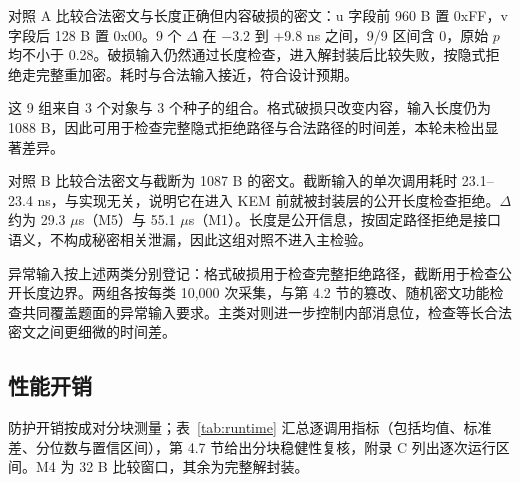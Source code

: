 对照 A 比较合法密文与长度正确但内容破损的密文：u 字段前 960 B 置 0xFF，v 字段后 128 B 置 0x00。9 个 $\Delta$ 在 $-3.2$ 到 +9.8 ns 之间，9/9 区间含 0，原始 $p$ 均不小于 0.28。破损输入仍然通过长度检查，进入解封装后比较失败，按隐式拒绝走完整重加密。耗时与合法输入接近，符合设计预期。

这 9 组来自 3 个对象与 3 个种子的组合。格式破损只改变内容，输入长度仍为 1088 B，因此可用于检查完整隐式拒绝路径与合法路径的时间差，本轮未检出显著差异。

对照 B 比较合法密文与截断为 1087 B 的密文。截断输入的单次调用耗时 23.1--23.4 ns，与实现无关，说明它在进入 KEM 前就被封装层的公开长度检查拒绝。$\Delta$ 约为 29.3 $\mu$s（M5）与 55.1 $\mu$s（M1）。长度是公开信息，按固定路径拒绝是接口语义，不构成秘密相关泄漏，因此这组对照不进入主检验。

异常输入按上述两类分别登记：格式破损用于检查完整拒绝路径，截断用于检查公开长度边界。两组各按每类 10,000 次采集，与第 4.2 节的篡改、随机密文功能检查共同覆盖题面的异常输入要求。主类对则进一步控制内部消息位，检查等长合法密文之间更细微的时间差。

\subsection{性能开销}

防护开销按成对分块测量；表~\ref{tab:runtime} 汇总逐调用指标（包括均值、标准差、分位数与置信区间），第 4.7 节给出分块稳健性复核，附录 C 列出逐次运行区间。M4 为 32 B 比较窗口，其余为完整解封装。%

